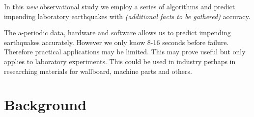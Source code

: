 \documentclass[]{llncs}
\begin{document}
In this {\em new} observational study we employ a series of algorithms and predict impending laboratory earthquakes with {\em (additional facts to be gathered)} accuracy.

The a-periodic data, hardware and software allows us to predict impending earthquakes accurately. However we only know 8-16 seconds before failure. Therefore practical applications may be limited. This may prove useful but only applies to laboratory experiments. This could be used in industry perhaps in researching materials for wallboard, machine parts and others.\par


\section{Background}




\end{document}
